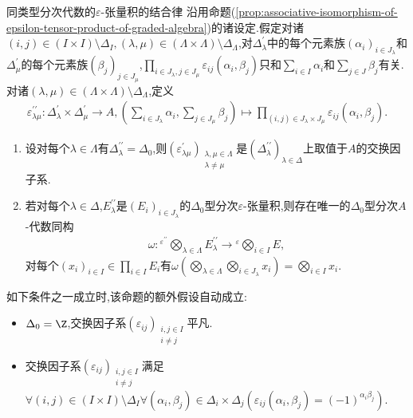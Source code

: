 \begin{proposition}{同类型分次代数的$\varepsilon$-张量积的结合律}{}
	沿用命题(\ref{prop:associative-isomorphism-of-epsilon-tensor-product-of-graded-algebra})的诸设定.假定对诸$\left(i,j\right)\in\left(I\times I\right)\setminus\Delta_{I},\left(\lambda,\mu\right)\in\left(\Lambda\times\Lambda\right)\setminus\Delta_{\Lambda}$,对$\Delta_{\lambda}^{\prime}$中的每个元素族$\left(\alpha_{i}\right)_{i\in J_{\lambda}}$和$\Delta_{\mu}^{\prime}$的每个元素族$\left(\beta_{j}\right)_{j\in J_{\mu}}$,$\prod\limits_{i\in J_{\lambda},j\in J_{\mu}}\varepsilon_{ij}\left(\alpha_{i},\beta_{j}\right)$只和$\sum\limits_{i\in I}\alpha_{i}$和$\sum\limits_{j\in J}\beta_{j}$有关.对诸$\left(\lambda,\mu\right)\in\left(\Lambda\times\Lambda\right)\setminus\Delta_{\Lambda}$,定义
	\begin{align*}
		\varepsilon_{\lambda\mu}^{\prime\prime}:\Delta_{\lambda}^{\prime}\times\Delta_{\mu}^{\prime}\to A,\left(\sum\limits_{i\in J_{\lambda}}\alpha_{i},\sum\limits_{j\in J_{\mu}}\beta_{j}\right)\mapsto\prod\limits_{\left(i,j\right)\in J_{\lambda}\times J_{\mu}}\varepsilon_{ij}\left(\alpha_{i},\beta_{j}\right).
	\end{align*}
	\begin{enumerate}
		\item 设对每个$\lambda\in\Lambda$有$\Delta_{\lambda}^{\prime\prime}=\Delta_{0}$,则$\left(\varepsilon_{\lambda\mu}^{\prime}\right)_{\substack{\lambda,\mu\in \Lambda\\ \lambda\neq\mu}}$是$\left(\Delta_{\lambda}^{\prime\prime}\right)_{\lambda\in\Delta}$上取值于$A$的交换因子系.
		\item 若对每个$\lambda\in\Delta$,$E_{\lambda}^{\prime\prime}$是$\left(E_{i}\right)_{i\in J_{\lambda}}$的$\Delta_{0}$型分次$\varepsilon$-张量积,则存在唯一的$\Delta_{0}$型分次$A$-代数同构
		\begin{align*}
			\omega:{}^{\varepsilon^{\prime\prime}}\bigotimes\limits_{\lambda\in\Lambda}E_{\lambda}^{\prime\prime}\to{}^{\varepsilon}\bigotimes\limits_{i\in I}E,
		\end{align*}
		对每个$\left(x_{i}\right)_{i\in I}\in\prod\limits_{i\in I}E_{i}$有$\omega\left(\bigotimes\limits_{\lambda\in\Lambda}\bigotimes\limits_{i\in J_{\lambda}}x_{i}\right)=\bigotimes\limits_{i\in I}x_{i}$.
	\end{enumerate}
\end{proposition}

\begin{remark}{}{}
	如下条件之一成立时,该命题的额外假设自动成立:
	\begin{itemize}
		\item $\Delta_{0}=\Z$,交换因子系$\left(\varepsilon_{ij}\right)_{\substack{i,j\in I\\i\neq j}}$平凡.
		\item 交换因子系$\left(\varepsilon_{ij}\right)_{\substack{i,j\in I\\i\neq j}}$满足$\forall\left(i,j\right)\in\left(I\times I\right)\setminus\Delta_{I}\forall\left(\alpha_{i},\beta_{j}\right)\in\Delta_{i}\times\Delta_{j}\left(\varepsilon_{ij}\left(\alpha_{i},\beta_{j}\right)=\left(-1\right)^{\alpha_{i}\beta_{j}}\right)$.
	\end{itemize}
\end{remark}

